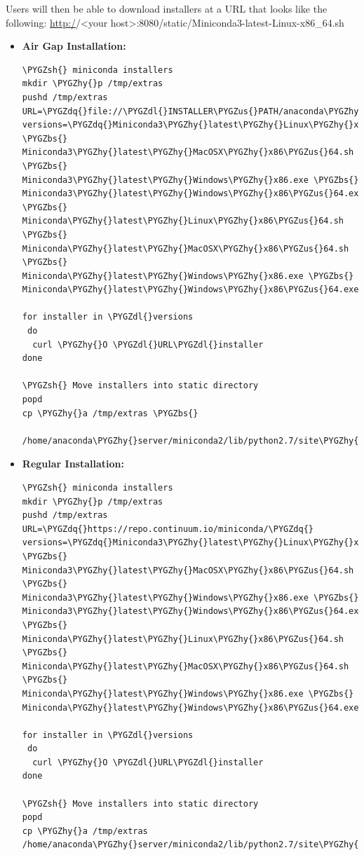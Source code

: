 \documentclass[letterpaper,10pt,openany,oneside]{sphinxmanual}
\def\PYGZbs{\char`\\}
\def\PYGZus{\char`\_}
\def\PYGZsh{\char`\#}
\def\PYGZdl{\char`\$}
\def\PYGZhy{\char`\-}
\def\PYGZdq{\char`\"}
\begin{document}
Users will then be able to download installers at a URL that looks like the
following: \url{http:/}/\textless{}your host\textgreater{}:8080/static/Miniconda3-latest-Linux-x86\_64.sh
\begin{itemize}
\item {} 
\textbf{Air Gap Installation:}

\begin{Verbatim}[commandchars=\\\{\}]
\PYGZsh{} miniconda installers
mkdir \PYGZhy{}p /tmp/extras
pushd /tmp/extras
URL=\PYGZdq{}file://\PYGZdl{}INSTALLER\PYGZus{}PATH/anaconda\PYGZhy{}suite/miniconda/\PYGZdq{}
versions=\PYGZdq{}Miniconda3\PYGZhy{}latest\PYGZhy{}Linux\PYGZhy{}x86\PYGZus{}64.sh \PYGZbs{}
Miniconda3\PYGZhy{}latest\PYGZhy{}MacOSX\PYGZhy{}x86\PYGZus{}64.sh \PYGZbs{}
Miniconda3\PYGZhy{}latest\PYGZhy{}Windows\PYGZhy{}x86.exe \PYGZbs{}
Miniconda3\PYGZhy{}latest\PYGZhy{}Windows\PYGZhy{}x86\PYGZus{}64.exe \PYGZbs{}
Miniconda\PYGZhy{}latest\PYGZhy{}Linux\PYGZhy{}x86\PYGZus{}64.sh \PYGZbs{}
Miniconda\PYGZhy{}latest\PYGZhy{}MacOSX\PYGZhy{}x86\PYGZus{}64.sh \PYGZbs{}
Miniconda\PYGZhy{}latest\PYGZhy{}Windows\PYGZhy{}x86.exe \PYGZbs{}
Miniconda\PYGZhy{}latest\PYGZhy{}Windows\PYGZhy{}x86\PYGZus{}64.exe\PYGZdq{}

for installer in \PYGZdl{}versions
 do
  curl \PYGZhy{}O \PYGZdl{}URL\PYGZdl{}installer
done

\PYGZsh{} Move installers into static directory
popd
cp \PYGZhy{}a /tmp/extras \PYGZbs{}
  /home/anaconda\PYGZhy{}server/miniconda2/lib/python2.7/site\PYGZhy{}packages/binstar/static
\end{Verbatim}

\item {} 
\textbf{Regular Installation:}

\begin{Verbatim}[commandchars=\\\{\}]
\PYGZsh{} miniconda installers
mkdir \PYGZhy{}p /tmp/extras
pushd /tmp/extras
URL=\PYGZdq{}https://repo.continuum.io/miniconda/\PYGZdq{}
versions=\PYGZdq{}Miniconda3\PYGZhy{}latest\PYGZhy{}Linux\PYGZhy{}x86\PYGZus{}64.sh \PYGZbs{}
Miniconda3\PYGZhy{}latest\PYGZhy{}MacOSX\PYGZhy{}x86\PYGZus{}64.sh \PYGZbs{}
Miniconda3\PYGZhy{}latest\PYGZhy{}Windows\PYGZhy{}x86.exe \PYGZbs{}
Miniconda3\PYGZhy{}latest\PYGZhy{}Windows\PYGZhy{}x86\PYGZus{}64.exe \PYGZbs{}
Miniconda\PYGZhy{}latest\PYGZhy{}Linux\PYGZhy{}x86\PYGZus{}64.sh \PYGZbs{}
Miniconda\PYGZhy{}latest\PYGZhy{}MacOSX\PYGZhy{}x86\PYGZus{}64.sh \PYGZbs{}
Miniconda\PYGZhy{}latest\PYGZhy{}Windows\PYGZhy{}x86.exe \PYGZbs{}
Miniconda\PYGZhy{}latest\PYGZhy{}Windows\PYGZhy{}x86\PYGZus{}64.exe\PYGZdq{}

for installer in \PYGZdl{}versions
 do
  curl \PYGZhy{}O \PYGZdl{}URL\PYGZdl{}installer
done

\PYGZsh{} Move installers into static directory
popd
cp \PYGZhy{}a /tmp/extras /home/anaconda\PYGZhy{}server/miniconda2/lib/python2.7/site\PYGZhy{}packages/binstar/static
\end{Verbatim}

\end{itemize}
\end{document}

